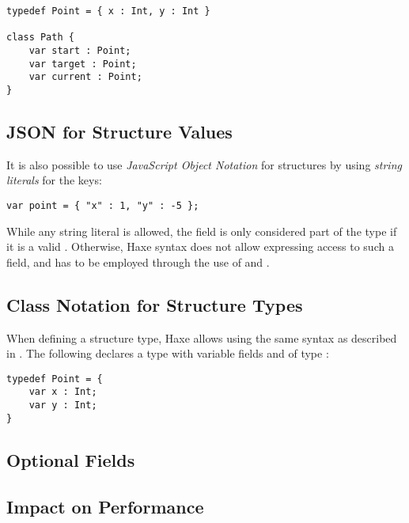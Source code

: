 \begin{lstlisting}
typedef Point = { x : Int, y : Int }

class Path {
    var start : Point;
    var target : Point;
    var current : Point;
}
\end{lstlisting}


\subsection{JSON for Structure Values}
\label{types-structure-json}

It is also possible to use \emph{JavaScript Object Notation} for structures by using \emph{string literals} for the keys:

\begin{lstlisting}
var point = { "x" : 1, "y" : -5 };
\end{lstlisting}
While any string literal is allowed, the field is only considered part of the type if it is a valid . Otherwise, Haxe syntax does not allow expressing access to such a field, and  has to be employed through the use of  and .

\subsection{Class Notation for Structure Types}
\label{types-structure-class-notation}

When defining a structure type, Haxe allows using the same syntax as described in . The following  declares a  type with variable fields  and  of type :

\begin{lstlisting}
typedef Point = {
    var x : Int;
    var y : Int;
}
\end{lstlisting}

\subsection{Optional Fields}
\label{types-structure-optional-fields}


\subsection{Impact on Performance}
\label{types-structure-performance}

